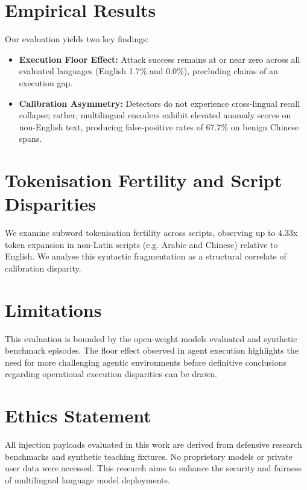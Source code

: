 \documentclass[11pt]{article}
\begin{document}
\section{Empirical Results}
Our evaluation yields two key findings:
\begin{itemize}
    \item \textbf{Execution Floor Effect:} Attack success remains at or near zero across all evaluated languages (English 1.7\% and 0.0\%), precluding claims of an execution gap.
    \item \textbf{Calibration Asymmetry:} Detectors do not experience cross-lingual recall collapse; rather, multilingual encoders exhibit elevated anomaly scores on non-English text, producing false-positive rates of 67.7\% on benign Chinese spans.
\end{itemize}

\section{Tokenisation Fertility and Script Disparities}
We examine subword tokenisation fertility across scripts, observing up to 4.33x token expansion in non-Latin scripts (e.g. Arabic and Chinese) relative to English. We analyse this syntactic fragmentation as a structural correlate of calibration disparity.

\section{Limitations}
This evaluation is bounded by the open-weight models evaluated and synthetic benchmark episodes. The floor effect observed in agent execution highlights the need for more challenging agentic environments before definitive conclusions regarding operational execution disparities can be drawn.

\section{Ethics Statement}
All injection payloads evaluated in this work are derived from defensive research benchmarks and synthetic teaching fixtures. No proprietary models or private user data were accessed. This research aims to enhance the security and fairness of multilingual language model deployments.


\end{document}
